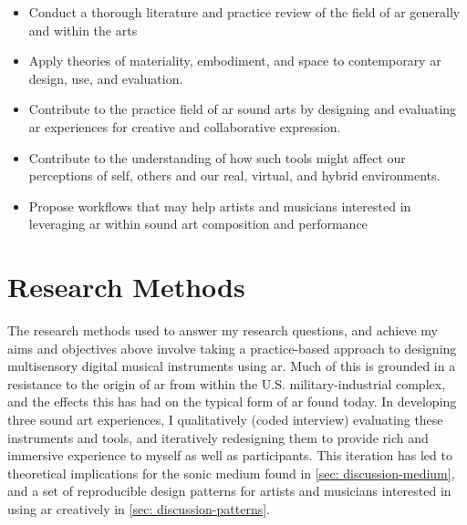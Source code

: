 \begin{itemize}
    \item Conduct a thorough literature and practice review of the field of \ac{ar} generally and within the arts
    \item Apply theories of materiality, embodiment, and space to contemporary \ac{ar} design, use, and evaluation.
    \item Contribute to the practice field of \ac{ar} sound arts by designing and evaluating \ac{ar} experiences for creative and collaborative expression.
    \item Contribute to the understanding of how such tools might affect our perceptions of self, others and our real, virtual, and hybrid environments. 
    \item Propose workflows that may help artists and musicians interested in leveraging \ac{ar} within sound art composition and performance
\end{itemize}



\section{Research Methods}\label{sec: introduction-methods}
The research methods used to answer my research questions, and achieve my aims and objectives above involve taking a practice-based approach to designing multisensory digital musical instruments using \ac{ar}. Much of this is grounded in a resistance to the origin of \ac{ar} from within the U.S. military-industrial complex, and the effects this has had on the typical form of \ac{ar} found today. In developing three sound \ac{art} experiences, I qualitatively (coded interview) evaluating these instruments and tools, and iteratively redesigning them to provide rich and immersive experience to myself as well as participants. This iteration has led to theoretical implications for the sonic medium found in \autoref{sec: discussion-medium}, and a set of reproducible design patterns for artists and musicians interested in using \ac{ar} creatively in \autoref{sec: discussion-patterns}.




